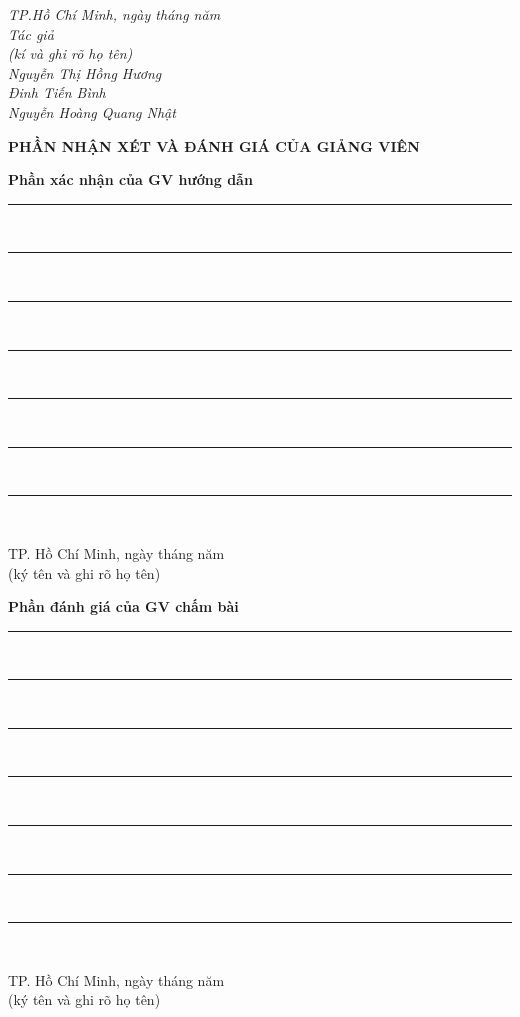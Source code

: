 \documentclass{report}
\newcommand\tab[1][1.25cm]{\hspace*{#1}}
\begin{document}
\begin{flushright}
   \emph{TP.Hồ Chí Minh, ngày \hspace{0.5cm}tháng \hspace{0.5cm}năm \hspace{0.5cm}}\\
    {\emph{Tác giả}} \hskip 2cm \quad\ \\
    {\emph{(kí và ghi rõ họ tên)}} \hskip 1cm \quad\ \\
    \vspace*{1.5cm}
{\emph{Nguyễn Thị Hồng Hương}} \hskip 1cm \quad\ \\
    \vspace*{1.5cm}
{\emph{Đinh Tiến Bình}} \hskip 2cm \quad\ \\
    \vspace*{1.5cm}
{\emph{Nguyễn Hoàng Quang Nhật}} \hskip 0.5cm \quad\ 

\end{flushright}
\pagebreak


\begin{center}
	\fontsize{16}{20}\selectfont
	\textbf{PHẦN NHẬN XÉT VÀ ĐÁNH GIÁ CỦA GIẢNG VIÊN}\\
\end{center}
\fontsize{13}{14}\selectfont
\textbf{Phần xác nhận của GV hướng dẫn}\\
\rule{16cm}{1pt}\\
\rule{16cm}{1pt}\\
\rule{16cm}{1pt}\\
\rule{16cm}{1pt}\\
\rule{16cm}{1pt}\\
\rule{16cm}{1pt}\\
\rule{16cm}{1pt}\\
\begin{flushright}
	TP. Hồ Chí Minh, ngày \tab[1cm] tháng \tab[1cm] năm \tab[1cm]\tab \\
	(ký tên và ghi rõ họ tên)\tab[2cm] \\
	\vspace{2cm}
\end{flushright}
\fontsize{13}{14}\selectfont
\textbf{Phần đánh giá của GV chấm bài}\\
\rule{16cm}{1pt}\\
\rule{16cm}{1pt}\\
\rule{16cm}{1pt}\\
\rule{16cm}{1pt}\\
\rule{16cm}{1pt}\\
\rule{16cm}{1pt}\\
\rule{16cm}{1pt}\\
\begin{flushright}
	TP. Hồ Chí Minh, ngày \tab[1cm] tháng \tab[1cm] năm \tab[1cm]\tab \\
	(ký tên và ghi rõ họ tên)\tab[2cm] \\
	\vspace{1.5cm}
\end{flushright}
\pagebreak
\end{document}
